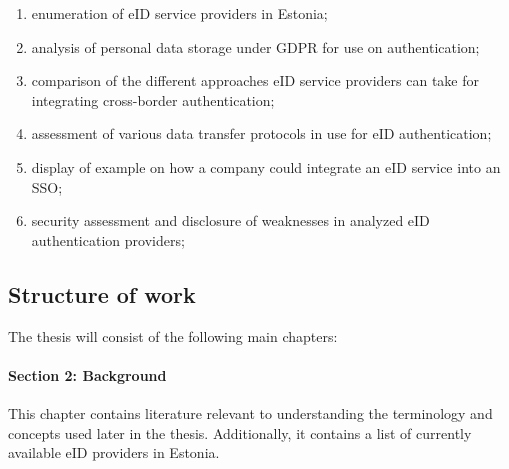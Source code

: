 \begin{enumerate}
    \item enumeration of eID service providers in Estonia;
    \item analysis of personal data storage under GDPR for use on authentication;
    \item comparison of the different approaches eID service providers can take for integrating cross-border authentication;
    \item assessment of various data transfer protocols in use for eID authentication;
    \item display of example on how a company could integrate an eID service into an SSO;
    \item security assessment and disclosure of weaknesses in analyzed eID authentication providers;
\end{enumerate}




\subsection{Structure of work}

The thesis will consist of the following main chapters:

\paragraph{Section 2: Background} This chapter contains literature relevant to understanding the terminology and concepts used later in the thesis. Additionally, it contains a list of currently available eID providers in Estonia.
